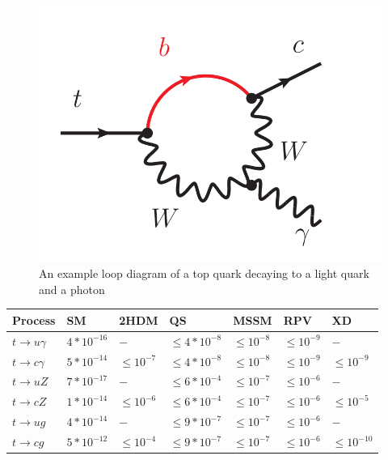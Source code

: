 \begin{figure}[h!]
	\centering
	\includegraphics[width=.5\columnwidth]{../ThesisImages/Theory/FCNCLoop.png}
	\caption{An example loop diagram of a top quark decaying to a light quark and a photon}
	\label{fig:FCNCLoop}
\end{figure}


\begin{table}[]
\begin{center}
\begin{tabular}{lllllll}
 \hhline{=======}
Process                                    & SM                        & 2HDM                   & QS                           & MSSM                   & RPV                          & XD                                 \\   \hline 
$t\rightarrow u\gamma $ &    $ 4*10^{-16} $        & $ -  $                   & $ \leq 4*10^{-8} $   & $ \leq 10^{-8} $ & $ \leq 10^{-9} $      &  $- $                                             \\
$t\rightarrow c\gamma $ &    $ 5*10^{-14} $        & $ \leq 10^{-7}   $ & $ \leq 4*10^{-8} $ & $ \leq 10^{-8} $ & $ \leq 10^{-9} $     & $ \leq 10^{-9}  $\\ \hline
$t\rightarrow u Z                    $ & $ 7*10^{-17} $  & $ -                     $ & $ \leq 6*10^{-4} $ & $ \leq 10^{-7} $ & $ \leq 10^{-6} $     & $ -  $                                             \\
$t\rightarrow c Z                    $ & $ 1*10^{-14} $  & $ \leq 10^{-6}   $ & $ \leq 6*10^{-4} $ & $ \leq 10^{-7} $ & $ \leq 10^{-6} $     & $ \leq 10^{-5} $ \\
$t\rightarrow u g                    $ & $ 4*10^{-14} $  & $ -                     $ & $ \leq 9*10^{-7} $ & $ \leq 10^{-7} $ & $ \leq 10^{-6} $     & $ -  $                                             \\
$t\rightarrow c g                    $ & $ 5*10^{-12} $  & $ \leq 10^{-4}   $  & $ \leq 9*10^{-7} $ & $ \leq 10^{-7} $ & $ \leq 10^{-6} $    & $ \leq 10^{-10} $ \\

\end{tabular}
\end{center}
\end{table}
